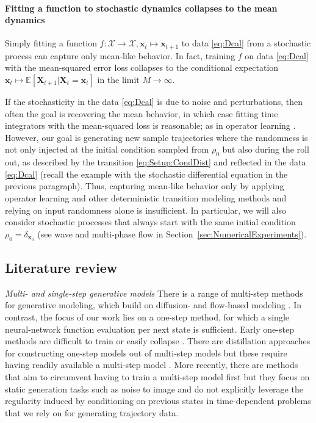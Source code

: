 \documentclass{article}
\theoremstyle{plain}
\theoremstyle{definition}
\theoremstyle{remark}
\newcommand{\x}{\bm{x}}
\newcommand{\X}{\bm{X}}
\begin{document}
\paragraph{Fitting a function to stochastic dynamics collapses to the mean dynamics}
Simply fitting a function $f: \mathcal X \to \mathcal X, \x_t \mapsto \x_{t + 1}$ to data \eqref{eq:Dcal} from a stochastic process can capture only mean-like behavior.
In fact, training $f$ on data \eqref{eq:Dcal} with the mean-squared error loss collapses to the conditional expectation $\x_t \mapsto  \mathbb{E}[\X_{t + 1} | \X_t = \x_t]$ in the limit $M \to \infty$.

If the stochasticity in the data \eqref{eq:Dcal} is due to noise and perturbations, then often the goal is recovering the mean behavior, in which case fitting time integrators with the mean-squared loss is reasonable; as in operator learning \cite{li2020fourier,lu2021learning,kovachki2023neural}.
However, our goal is generating new sample trajectories where the randomness is not only injected at the initial condition sampled from $\rho_0$ but also during the roll out, as described by the transition \eqref{eq:Setup:CondDist} and reflected in the data \eqref{eq:Dcal} (recall the example with the stochastic differential equation in the previous paragraph).
Thus, capturing mean-like behavior only by applying operator learning and other deterministic transition modeling methods and relying on input randomness alone is insufficient. In particular, we will also consider stochastic processes that always start with the same initial condition $\rho_0 = \delta_{\x_0}$ (see wave and multi-phase flow in Section~\ref{sec:NumericalExperiments}).

\subsection{Literature review}
\emph{Multi- and single-step generative models} There is a range of multi-step methods for generative modeling, which build on diffusion- and flow-based modeling \cite{sohl-dickstein15,HOjon_ddpm,hyvarinen05a,song2019sliced,song2020generativealg,song2021scorebased,albergo2023building,albergo2023stochastic,lipman2022flow, liu2022flowstraightfastlearning}. In contrast, the focus of our work lies on a one-step method, for which a single neural-network function evaluation per next state is sufficient. Early one-step methods are difficult to train \cite{goodfellow2014generative, arjovsky2017wasserstein} or easily collapse \cite{kingma2013auto}. There are distillation approaches for constructing one-step models out of multi-step models but these require having readily available a multi-step model  \cite{yin2024onestep,10.1007/978-3-031-73016-0_6,ZhouZWYH24, song2023consistency,geng2024consistencymodelseasy,frans2024one}. More recently, there are methods that aim to circumvent having to train a multi-step model first \cite{song2023consistency,zhou2025inductivemomentmatching,geng2025mean,boffi2025how} but they focus on static generation tasks such as noise to image and do not explicitly leverage the regularity induced by conditioning on previous states in time-dependent problems that we rely on for generating trajectory data.
\end{document}
